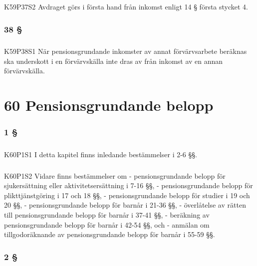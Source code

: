 \documentclass[a4paper,notitlepage,openany,10pt]{book}
\begin{document}
\paragraph*{}
{\tiny K59P37S2}
Avdraget görs i första hand från inkomst enligt 14 § första stycket 4.
\subsection*{38 §}
\paragraph*{}
{\tiny K59P38S1}
När pensionsgrundande inkomster av annat förvärvsarbete beräknas ska underskott i en förvärvskälla inte dras av från inkomst av en annan förvärvskälla.
\chapter*{60 Pensionsgrundande belopp}
\subsection*{1 §}
\paragraph*{}
{\tiny K60P1S1}
I detta kapitel finns inledande bestämmelser i 2-6 §§.
\paragraph*{}
{\tiny K60P1S2}
Vidare finns bestämmelser om
\newline - pensionsgrundande belopp för sjukersättning eller aktivitetsersättning i 7-16 §§,
\newline - pensionsgrundande belopp för plikttjänstgöring i 17 och 18 §§,
\newline - pensionsgrundande belopp för studier i 19 och 20 §§,
\newline - pensionsgrundande belopp för barnår i 21-36 §§,
\newline - överlåtelse av rätten till pensionsgrundande belopp för barnår i 37-41 §§,
\newline - beräkning av pensionsgrundande belopp för barnår i 42-54 §§, och
\newline - anmälan om tillgodoräknande av pensionsgrundande belopp för barnår i 55-59 §§.
\subsection*{2 §}
\end{document}
